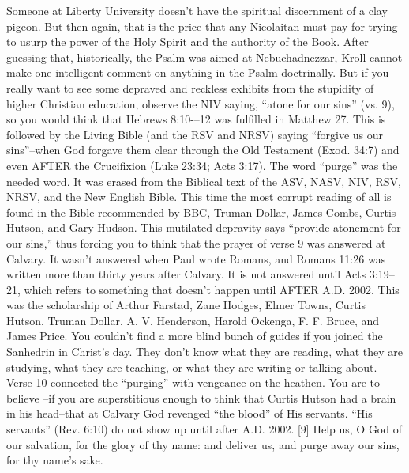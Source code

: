 {Someone at Liberty University doesn’t have the spiritual discernment of a clay pigeon. But then again, that is the price that any Nicolaitan must pay for trying to usurp the power of the Holy Spirit and the authority of the Book. After guessing that, historically, the Psalm was aimed at Nebuchadnezzar, Kroll cannot make one intelligent comment on anything in the Psalm doctrinally. But if you really want to see some depraved and reckless exhibits from the stupidity of higher Christian education, observe the NIV saying, “atone for our sins” (vs. 9), so you would think that Hebrews 8:10-–12 was fulfilled in Matthew 27. This is followed by the Living Bible (and the RSV and NRSV) saying “forgive us our sins”--when God forgave them clear through the Old Testament (Exod. 34:7) and even AFTER the Crucifixion (Luke 23:34; Acts 3:17). The  word “purge” was the needed word. It was erased from the Biblical text of the ASV, NASV, NIV, RSV, NRSV, and the New English Bible. This time the most corrupt reading of all is found in the Bible recommended by BBC, Truman Dollar, James Combs, Curtis Hutson, and Gary Hudson. This mutilated depravity says “provide atonement for our sins,” thus forcing you to think that the prayer of verse 9 was answered at Calvary. It wasn’t answered when Paul wrote Romans, and Romans 11:26 was written more than thirty years after Calvary. It is not answered until Acts 3:19--21, which refers to something that doesn’t happen until AFTER A.D. 2002. This was the scholarship of Arthur Farstad, Zane Hodges, Elmer Towns, Curtis Hutson, Truman Dollar, A. V. Henderson, Harold Ockenga, F. F. Bruce, and James Price. You couldn’t find a more blind bunch of guides if you joined the Sanhedrin in Christ’s day. They don’t know what they are reading, what they are studying, what they are teaching, or what they are writing or talking about. Verse 10 connected the “purging” with vengeance on the heathen. You are to believe --if you are superstitious enough to think that Curtis Hutson had a brain in his head--that at Calvary God revenged “the blood” of His servants. “His servants” (Rev. 6:10) do not show up until after A.D. 2002.\cite{Ruckman1992Psalms}}
[9] \textcolor[rgb]{0.00,0.00,1.00}{Help us, O God of our salvation, for the glory of thy name: and deliver us, and purge away our sins, for thy name's sake.}
